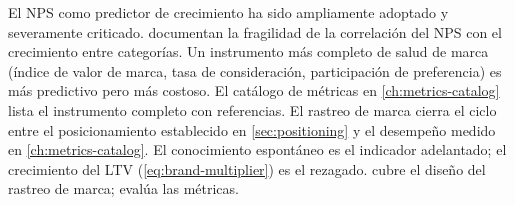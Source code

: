 El NPS como predictor de crecimiento ha sido ampliamente adoptado y severamente criticado. \textcite{bendle2020marketing} documentan la fragilidad de la correlación del NPS con el crecimiento entre categorías. Un instrumento más completo de salud de marca (índice de valor de marca, tasa de consideración, participación de preferencia) es más predictivo pero más costoso. El catálogo de métricas en \cref{ch:metrics-catalog} lista el instrumento completo con referencias. El rastreo de marca cierra el ciclo entre el posicionamiento establecido en \cref{sec:positioning} y el desempeño medido en \cref{ch:metrics-catalog}. El conocimiento espontáneo es el indicador adelantado; el crecimiento del LTV (\cref{eq:brand-multiplier}) es el rezagado. \textcite{kotler2021} cubre el diseño del rastreo de marca; \textcite{bendle2020marketing} evalúa las métricas.
